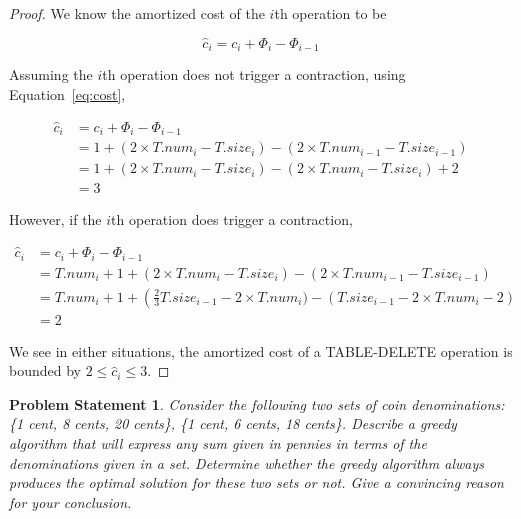 \documentclass[12pt,listof=totoc,toc=sectionentrywithdots]{scrartcl}
\newtheorem*{statement}{Problem Statement}
\begin{document}
\begin{proof}
    We know the amortized cost of the $i$th operation to be

    \begin{equation}\label{eq:cost}
        \hat{c}_i = c_i + \Phi_i - \Phi_{i - 1}
    \end{equation}

    Assuming the $i$th operation does not trigger a contraction, using Equation~\ref{eq:cost},

    \begin{align*}
        \hat{c}_i &= c_i + \Phi_i - \Phi_{i - 1} \\
                  &= 1 + \left(2 \times T.num_i - T.size_i\right) - \left(2 \times T.num_{i - 1} - T.size_{i - 1}\right) \\
                  &= 1 + \left(2\times T.num_i - T.size_i\right) - \left(2\times T.num_i - T.size_i \right) + 2 \\
                  &= 3
    \end{align*}

    However, if the $i$th operation does trigger a contraction,

    \begin{align*}
        \hat{c}_i &= c_i + \Phi_i - \Phi_{i - 1} \\
                  &= T.num_i + 1 + \left(2 \times T.num_i - T.size_i\right) - \left(2 \times T.num_{i-1} - T.size_{i-1}\right) \\
                  &= T.num_i + 1 + \left(\frac{2}{3} T.size_{i-1} - 2 \times T.num_i) - \left(T.size_{i-1} - 2\times T.num_i - 2\right) \\
                  &= 2
    \end{align*}

    We see in either situations, the amortized cost of a TABLE-DELETE operation is bounded by $2 \leq \hat{c}_i \leq 3$.

\end{proof}

\problem{}
\subproblem{}
\begin{statement}
    Consider the following two sets of coin denominations: \{1 cent, 8 cents, 20 cents\}, \{1 cent, 6 cents, 18 cents\}. Describe a greedy algorithm that will express any sum given in pennies in terms of the denominations given in a set. Determine whether the greedy algorithm always produces the optimal solution for these two sets or not. Give a convincing reason for your conclusion.
\end{statement}
\end{document}
